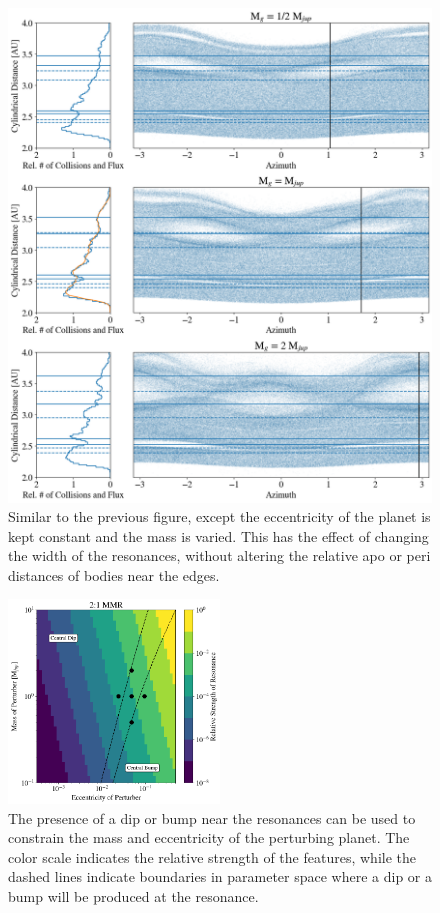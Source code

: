 \documentclass[onecolumn]{aastex63}
\begin{document}
\begin{figure}
    \includegraphics[width=\textwidth]{figures/coll_polar_m.png}
    \caption{Similar to the previous figure, except the eccentricity of the planet is kept constant and the mass is varied.
    This has the effect of changing the width of the resonances, without altering the relative apo or peri distances of
    bodies near the edges.\label{fig:coll_polar_m}}
\end{figure}

\begin{figure}
\begin{center}
    \includegraphics[width=0.5\textwidth]{figures/bump_dip_diag.png}
    \caption{The presence of a dip or bump near the resonances can be used to constrain the mass and eccentricity
    of the perturbing planet. The color scale indicates the relative strength of the features, while the dashed lines
    indicate boundaries in parameter space where a dip or a bump will be produced at the resonance.\label{fig:bump_dip_diag}}
\end{center}
\end{figure}



\clearpage
\end{document}
